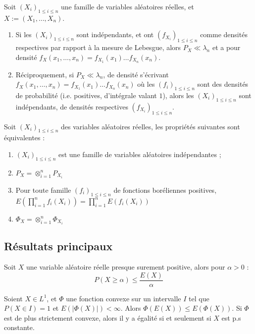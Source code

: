 \documentclass[11pt,a4paper]{article}
\begin{document}
\begin{propstar}
 Soit $(X_i)_{ 1 \leq i \leq n}$ une famille de variables aléatoires réelles, et $X:=(X_1,\dots,X_n)$. 
\begin{enumerate}
\item Si les $(X_i)_{ 1 \leq i \leq n}$ sont indépendants, et ont $(f_{X_i})_{1\leq i \leq n}$ comme densités respectives par rapport à la mesure de Lebesgue, alors $P_X \ll \lambda_n$ et a pour densité $f_X(x_1,\dots,x_n)=f_{X_1}(x_1)\dots f_{X_n}(x_n)$.
\item Réciproquement, si $P_X \ll \lambda_n$, de densité s'écrivant $f_X(x_1,\dots,x_n)=f_{X_1}(x_1)\dots f_{X_n}(x_n)$ où les $(f_i)_{1\leq i \leq n}$ sont des densités de probabilité (i.e. positives, d'intégrale valant $1$), alors les $(X_i)_{ 1 \leq i \leq n}$ sont indépendants, de densités respectives $(f_{X_i})_{1\leq i \leq n}$.
\end{enumerate}
\end{propstar}

\begin{corstar} Soit $(X_i)_{ 1 \leq i \leq n}$ des variables aléatoires réelles, les propriétés suivantes sont équivalentes :
\begin{enumerate}
\item  $(X_i)_{ 1 \leq i \leq n}$ est une famille de variables aléatoires indépendantes ; 
\item $P_X=\otimes_{i=1}^n P_{X_i}$
\item Pour toute famille $(f_i)_{1\leq i \leq n}$ de fonctions boréliennes positives, $\displaystyle E\left(\prod_{i=1}^n f_i(X_i)\right) = \prod_{i=1}^n E\left(f_i(X_i)\right)$
\item $\Phi_X=\otimes_{i=1}^n \Phi_{X_i}$
\end{enumerate}
\end{corstar}


\subsection*{Résultats principaux}

\begin{thmstar}
 Soit $X$ une variable aléatoire réelle presque surement positive, alors pour $\alpha>0$ : \[P(X \geq \alpha) \leq \frac{E(X)}{\alpha}\]
\end{thmstar}

\begin{thmstar}
 Soient $X\in L^1$, et $\Phi$ une fonction convexe sur un intervalle $I$ tel que $P(X\in I)=1$ et $E(|\Phi(X)|)<\infty$. Alors $\Phi(E(X)) \leq E(\Phi(X))$. Si $\Phi$ est de plus strictement convexe, alors il y a égalité si et seulement si $X$ est p.s constante.
\end{thmstar}
\end{document}
